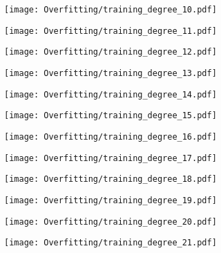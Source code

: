 \documentclass[xcolor=pdftex,dvipsnames,table]{beamer}
\begin{document}
\frame
{
	\begin{center}
		\texttt{[image: Overfitting/training\_degree\_10.pdf]}
	\end{center}
}

\frame
{
	\begin{center}
		\texttt{[image: Overfitting/training\_degree\_11.pdf]}
	\end{center}
}

\frame
{
	\begin{center}
		\texttt{[image: Overfitting/training\_degree\_12.pdf]}
	\end{center}
}

\frame
{
	\begin{center}
		\texttt{[image: Overfitting/training\_degree\_13.pdf]}
	\end{center}
}

\frame
{
	\begin{center}
		\texttt{[image: Overfitting/training\_degree\_14.pdf]}
	\end{center}
}

\frame
{
	\begin{center}
		\texttt{[image: Overfitting/training\_degree\_15.pdf]}
	\end{center}
}

\frame
{
	\begin{center}
		\texttt{[image: Overfitting/training\_degree\_16.pdf]}
	\end{center}
}

\frame
{
	\begin{center}
		\texttt{[image: Overfitting/training\_degree\_17.pdf]}
	\end{center}
}

\frame
{
	\begin{center}
		\texttt{[image: Overfitting/training\_degree\_18.pdf]}
	\end{center}
}

\frame
{
	\begin{center}
		\texttt{[image: Overfitting/training\_degree\_19.pdf]}
	\end{center}
}

\frame
{
	\begin{center}
		\texttt{[image: Overfitting/training\_degree\_20.pdf]}
	\end{center}
}

\frame
{
	\begin{center}
		\texttt{[image: Overfitting/training\_degree\_21.pdf]}
	\end{center}
}
\end{document}

